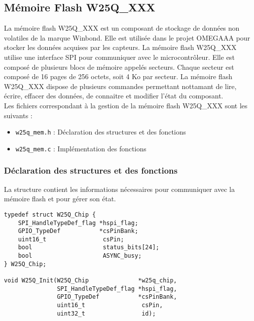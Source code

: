 \subsection{Mémoire Flash W25Q\_XXX}
\label{subsec:w25q}

La mémoire flash W25Q\_XXX est un composant de stockage de données non volatiles
de la marque Winbond. Elle est utilisée dans le projet OMEGAAA pour stocker les
données acquises par les capteurs. La mémoire flash W25Q\_XXX utilise une interface
SPI pour communiquer avec le microcontrôleur. Elle est composé de plusieurs blocs
de mémoire appelés secteurs. Chaque secteur est composé de 16 pages de 256 octets,
soit 4 Ko par secteur. La mémoire flash W25Q\_XXX dispose de plusieurs commandes
permettant nottamant de lire, écrire, effacer des données, de connaitre et modifier
l'état du composant.\\

Les fichiers correspondant à la gestion de la mémoire flash W25Q\_XXX sont les
suivants :

\begin{itemize}
    \item \texttt{w25q\_mem.h} : Déclaration des structures et des fonctions
    \item \texttt{w25q\_mem.c} : Implémentation des fonctions
\end{itemize}

\subsubsection{Déclaration des structures et des fonctions}


La structure contient les informations nécessaires pour communiquer avec la
mémoire flash et pour gérer son état.

\begin{lstlisting}[style=prog, frame=shadowbox, label={lst:w25q_dec},
    emph={[1]W25Q_Init}, emphstyle={[1]\color{C}},
    emph={[2]GPIO_TypeDef, W25Q_Chip, SPI_HandleTypeDef_flag}, emphstyle={[2]\color{E}}]
typedef struct W25Q_Chip {
	SPI_HandleTypeDef_flag *hspi_flag;
	GPIO_TypeDef           *csPinBank;
	uint16_t                csPin;
	bool                    status_bits[24];
	bool                    ASYNC_busy;
} W25Q_Chip;

void W25Q_Init(W25Q_Chip              *w25q_chip,
               SPI_HandleTypeDef_flag *hspi_flag,
               GPIO_TypeDef           *csPinBank,
               uint16_t                csPin,
               uint32_t                id);
\end{lstlisting}

